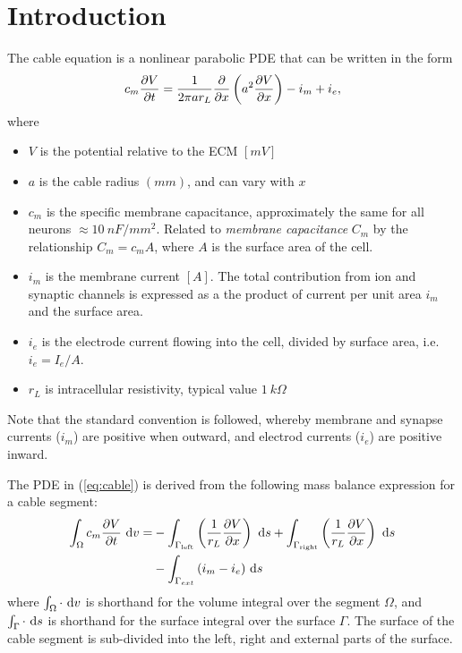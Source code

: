 \section*{Introduction}

The cable equation is a nonlinear parabolic PDE that can be written in the form
\begin{equation}
    \label{eq:cable}
    c_m \frac{\partial{V}}{\partial{t}} = \frac{1}{2\pi a r_{L}} \frac{\partial{}}{\partial{x}} \left( a^2 \frac{\partial{V}}{\partial{x}} \right) - i_m + i_e,
\end{equation}
where
\begin{itemize}
    \item $V$ is the potential relative to the ECM $[mV]$
    \item $a$ is the cable radius $(mm)$, and can vary with $x$
    \item $c_m$ is the {specific membrane capacitance}, approximately the same for all neurons $\approx 10~nF/mm^2$. Related to \emph{membrane capacitance} $C_m$ by the relationship $C_m=c_{m}A$, where $A$ is the surface area of the cell.
    \item $i_m$ is the membrane current $[A]$. The total contribution from ion and synaptic channels is expressed as a the product of current per unit area $i_m$ and the surface area.
    \item $i_e$ is the electrode current flowing into the cell, divided by surface area, i.e. $i_e=I_e/A$.
    \item $r_L$ is intracellular resistivity, typical value $1~k\Omega$
\end{itemize}

Note that the standard convention is followed, whereby membrane and synapse currents ($i_m$) are positive when outward, and electrod currents ($i_e$) are positive inward.

The PDE in (\ref{eq:cable}) is derived from the following mass balance expression for a cable segment:
\begin{align}
    \int_{\Omega}{c_m \frac{\partial{V}}{\partial{t}} } ~\text{d}{v} =
        & - \int_{\Gamma_{\text{left}}} \left( \frac{1}{r_L}\frac{\partial{V}}{\partial{x}} \right) ~\text{d}{s}
          + \int_{\Gamma_{\text{right}}} \left( \frac{1}{r_L}\frac{\partial{V}}{\partial{x}} \right) ~\text{d}{s} \nonumber \\
        & - \int_{\Gamma_{ext}} {(i_m - i_e)} ~\text{d}{s}
    \label{eq:cable_balance}
\end{align}
where $\int_\Omega \cdot ~\text{d}{v}$ is shorthand for the volume  integral over the segment $\Omega$, and $\int_\Gamma \cdot ~\text{d}{s}$ is shorthand for the surface integral over the surface $\Gamma$.
The surface of the cable segment is sub-divided into the left, right and external parts of the surface.

